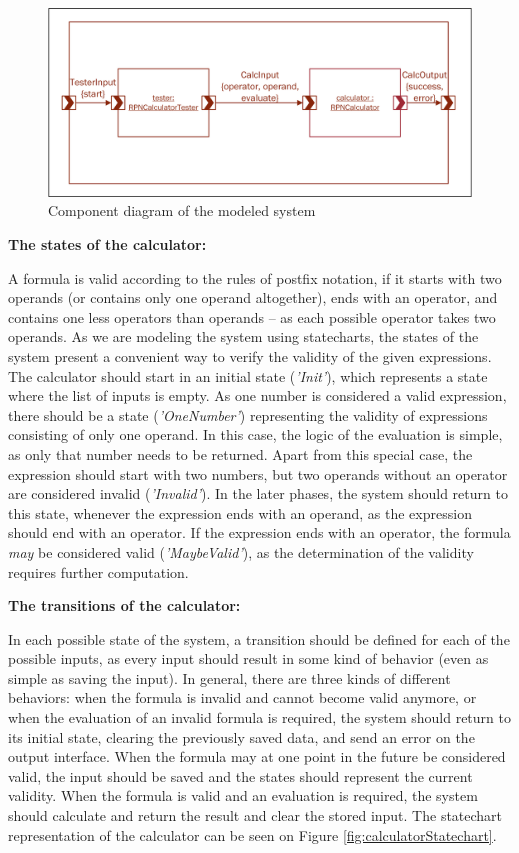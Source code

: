 \begin{figure}[!ht]
	\centering
	\includegraphics[width=150mm, keepaspectratio]{figures/calculatorComponents.png}
	\caption{Component diagram of the modeled system}
	\label{fig:calculatorComponents}
\end{figure}

\textbf{The states of the calculator:}

A formula is valid according to the rules of postfix notation, if it starts with two operands (or contains only one operand altogether), ends with an operator, and contains one less operators than operands -- as each possible operator takes two operands. As we are modeling the system using statecharts, the states of the system present a convenient way to verify the validity of the given expressions. The calculator should start in an initial state (\textit{'Init'}), which represents a state where the list of inputs is empty. As one number is considered a valid expression, there should be a state (\textit{'OneNumber'}) representing the validity of expressions consisting of only one operand. In this case, the logic of the evaluation is simple, as only that number needs to be returned. Apart from this special case, the expression should start with two numbers, but two operands without an operator are considered invalid (\textit{'Invalid'}). In the later phases, the system should return to this state, whenever the expression ends with an operand, as the expression should end with an operator. If the expression ends with an operator, the formula \textit{may} be considered valid (\textit{'MaybeValid'}), as the determination of the validity requires further computation.

\newpage
\textbf{The transitions of the calculator:}

In each possible state of the system, a transition should be defined for each of the possible inputs, as every input should result in some kind of behavior (even as simple as saving the input). In general, there are three kinds of different behaviors: when the formula is invalid and cannot become valid anymore, or when the evaluation of an invalid formula is required, the system should return to its initial state, clearing the previously saved data, and send an error on the output interface. When the formula may at one point in the future be considered valid, the input should be saved and the states should represent the current validity. When the formula is valid and an evaluation is required, the system should calculate and return the result and clear the stored input. The statechart representation of the calculator can be seen on Figure \ref{fig:calculatorStatechart}.

